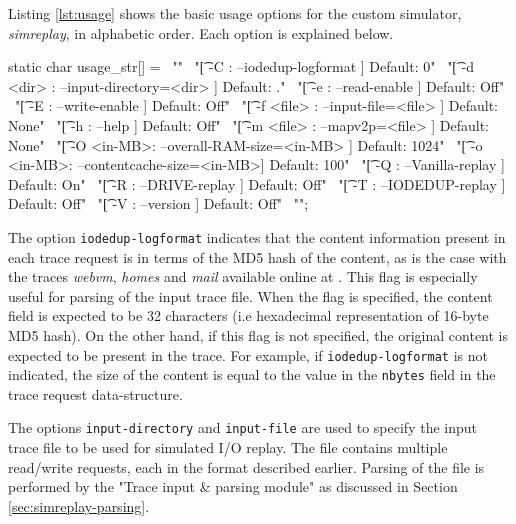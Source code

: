 
Listing \ref{lst:usage} shows the basic usage options for the custom
simulator, \textit{simreplay}, in alphabetic order. Each option is
explained below.

\begin{snippet}
static char usage_str[] =                                               \
        "\n"                                                            \   
        "\t[ -C        : --iodedup-logformat        ] Default: 0\n"     \   
        "\t[ -d <dir>  : --input-directory=<dir>    ] Default: .\n"     \   
        "\t[ -e        : --read-enable              ] Default: Off\n"   \   
        "\t[ -E        : --write-enable             ] Default: Off\n"   \   
        "\t[ -f <file> : --input-file=<file>        ] Default: None\n"  \   
        "\t[ -h        : --help                     ] Default: Off\n"   \   
        "\t[ -m <file> : --mapv2p=<file>            ] Default: None\n"  \   
        "\t[ -O <in-MB>: --overall-RAM-size=<in-MB> ] Default: 1024\n"  \   
        "\t[ -o <in-MB>: --contentcache-size=<in-MB>] Default: 100\n"   \   
        "\t[ -Q        : --Vanilla-replay           ] Default: On\n"    \   
        "\t[ -R        : --DRIVE-replay             ] Default: Off\n"   \   
        "\t[ -T        : --IODEDUP-replay           ] Default: Off\n"   \   
        "\t[ -V        : --version                  ] Default: Off\n"   \   
        "\n";	
\end{snippet}

The option \texttt{iodedup-logformat} indicates that the content information
present in each trace request is in terms of the MD5 hash of the content,
as is the case with the traces \textit{webvm}, \textit{homes} and
\textit{mail} available online at \cite{iodedup-online}. 
This flag is especially useful for parsing of the input trace file.
When the flag is specified, the content field is expected to be 32 
characters (i.e hexadecimal representation of 16-byte MD5 hash). On the 
other hand, if this flag is 
not specified, the original content is expected to be present in the trace. 
For example, if \texttt{iodedup-logformat} is not indicated, the size of the 
content is equal to the value in the \texttt{nbytes} field in the trace
request data-structure.

The options \texttt{input-directory} and \texttt{input-file} are used
to specify the input trace file to be used for simulated I/O replay. The
file contains multiple read/write requests, each in the format described
earlier. Parsing of the file is performed by the "Trace input \& parsing
module" as discussed in Section \ref{sec:simreplay-parsing}.

